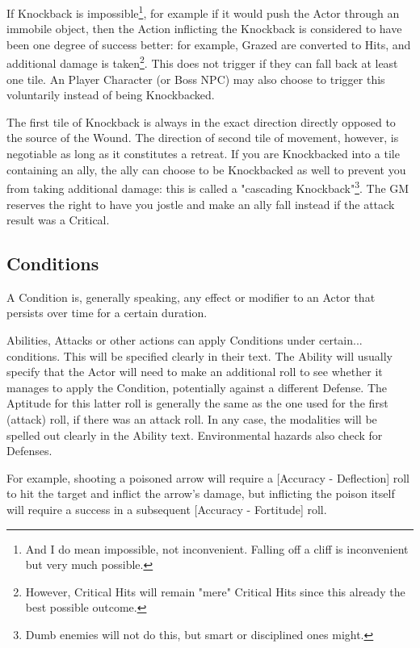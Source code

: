 If Knockback is impossible\footnote{And I do mean impossible, not inconvenient. Falling off a cliff is inconvenient but very much possible.}, for example if it would push the Actor through an immobile object, then the Action inflicting the Knockback is considered to have been one degree of success better: for example, Grazed are converted to Hits, and additional damage is taken\footnote{However, Critical Hits will remain "mere" Critical Hits since this already the best possible outcome.}. This does not trigger if they can fall back at least one tile. An Player Character (or Boss NPC) may also choose to trigger this voluntarily instead of being Knockbacked.

The first tile of Knockback is always in the exact direction directly opposed to the source of the Wound. The direction of second tile of movement, however, is negotiable as long as it constitutes a retreat. If you are Knockbacked into a tile containing an ally, the ally can choose to be Knockbacked as well to prevent you from taking additional damage: this is called a "cascading Knockback"\footnote{Dumb enemies will not do this, but smart or disciplined ones might.}. The GM reserves the right to have you jostle and make an ally fall instead if the attack result was a Critical.

\subsection{Conditions}
\label{conditions}

A Condition is, generally speaking, any effect or modifier to an Actor that persists over time for a certain duration.

Abilities, Attacks or other actions can apply Conditions under certain... conditions. This will be specified clearly in their text. The Ability will usually specify that the Actor will need to make an additional roll to see whether it manages to apply the Condition, potentially against a different Defense. The Aptitude for this latter roll is generally the same as the one used for the first (attack) roll, if there was an attack roll. In any case, the modalities will be spelled out clearly in the Ability text. Environmental hazards also check for Defenses. 

For example, shooting a poisoned arrow will require a [Accuracy - Deflection] roll to hit the target and inflict the arrow's damage, but inflicting the poison itself will require a success in a subsequent [Accuracy - Fortitude] roll.

